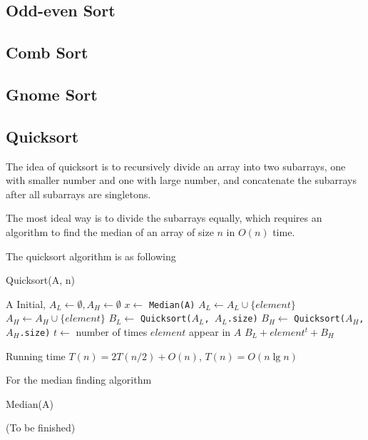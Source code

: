 			\subsection{Odd-even Sort}

			\subsection{Comb Sort}

			\subsection{Gnome Sort}

			\subsection{Quicksort}
				The idea of quicksort is to recursively divide an array into two subarrays, one with smaller number and one with large number, and concatenate  the subarrays after all subarrays are singletons.

				The most ideal way is to divide the subarrays equally, which requires an algorithm to find the median of an array of size $n$ in $O(n)$ time.

				The quicksort algorithm is as following
				\begin{algorithm}[h]
					\caption{Quicksort(A, n)}
					\begin{algorithmic}[1]
							\Return A
						\EndIf
						\State Initial, $A_L \gets \emptyset, A_H \gets \emptyset$
						\State $x \gets$ \texttt{Median(A)}
								\State $A_L \gets A_L \cup \{element\}$
							\Else
								\State $A_H \gets A_H \cup \{element\}$
							\EndIf
						\EndFor
						\State $B_L \gets$ \texttt{Quicksort($A_L$, $A_L$.size)}
						\State $B_H \gets$ \texttt{Quicksort($A_H$, $A_H$.size)}
						\State $t \gets$ number of times $element$ appear in $A$
						\Return $B_L + element^t + B_H$
					\end{algorithmic}
				\end{algorithm}

				Running time $T(n) = 2T(n/2) + O(n)$, $T(n) = O(n\lg n)$

				For the median finding algorithm
				\begin{algorithm}[h]
					\caption{Median(A)}
					\begin{algorithmic}[1]
						\State (To be finished)
					\end{algorithmic}
				\end{algorithm}

